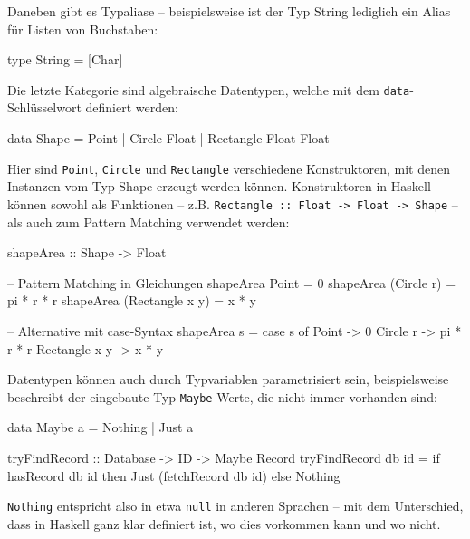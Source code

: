 \documentclass[12pt, a4paper, bibgerm]{scrbook}
\newenvironment{DIFnomarkup}{}{}
\newcommand\icode[1]{\lstinline?#1?}
\begin{document}
Daneben gibt es Typaliase -- beispielsweise ist der Typ String lediglich
ein Alias für Listen von Buchstaben:
\begin{DIFnomarkup}\begin{code}
type String = [Char]
\end{code}\end{DIFnomarkup}

Die letzte Kategorie sind algebraische Datentypen, welche mit dem
\icode{data}-Schlüsselwort definiert werden:
\begin{DIFnomarkup}\begin{code}
data Shape = Point
           | Circle Float
           | Rectangle Float Float
\end{code}\end{DIFnomarkup}
Hier sind \icode{Point}, \icode{Circle} und \icode{Rectangle}
verschiedene Konstruktoren, mit denen Instanzen vom Typ Shape erzeugt
werden können. Konstruktoren in Haskell können sowohl als Funktionen --
z.B. \icode{Rectangle :: Float -> Float -> Shape} -- als auch zum Pattern
Matching verwendet werden:
\begin{DIFnomarkup}\begin{code}
shapeArea :: Shape -> Float

-- Pattern Matching in Gleichungen
shapeArea Point           = 0
shapeArea (Circle r)      = pi * r * r
shapeArea (Rectangle x y) = x * y

-- Alternative mit case-Syntax
shapeArea s = case s of
                Point         -> 0
                Circle r      -> pi * r * r
                Rectangle x y -> x * y
\end{code}\end{DIFnomarkup}

Datentypen können auch durch Typvariablen parametrisiert sein,
beispielsweise beschreibt der eingebaute Typ \icode{Maybe} Werte, die
nicht immer vorhanden sind:
\begin{DIFnomarkup}\begin{code}
data Maybe a = Nothing | Just a

tryFindRecord :: Database -> ID -> Maybe Record
tryFindRecord db id = if hasRecord db id
                      then
                        Just (fetchRecord db id)
                      else
                        Nothing
\end{code}\end{DIFnomarkup}
\icode{Nothing} entspricht also in etwa \icode{null} in anderen Sprachen
-- mit dem Unterschied, dass in Haskell ganz klar definiert ist, wo dies
vorkommen kann und wo nicht.
\end{document}
